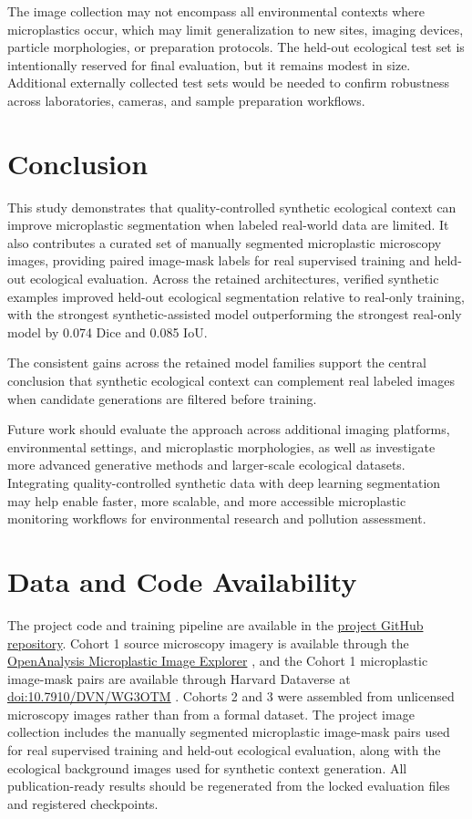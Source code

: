 \documentclass[11pt]{article}
\begin{document}
The image collection may not encompass all environmental contexts where microplastics occur, which may limit generalization to new sites, imaging devices, particle morphologies, or preparation protocols. The held-out ecological test set is intentionally reserved for final evaluation, but it remains modest in size. Additional externally collected test sets would be needed to confirm robustness across laboratories, cameras, and sample preparation workflows.

\section{Conclusion}
This study demonstrates that quality-controlled synthetic ecological context can improve microplastic segmentation when labeled real-world data are limited. It also contributes a curated set of manually segmented microplastic microscopy images, providing paired image-mask labels for real supervised training and held-out ecological evaluation. Across the retained architectures, verified synthetic examples improved held-out ecological segmentation relative to real-only training, with the strongest synthetic-assisted model outperforming the strongest real-only model by 0.074 Dice and 0.085 IoU.

The consistent gains across the retained model families support the central conclusion that synthetic ecological context can complement real labeled images when candidate generations are filtered before training.

Future work should evaluate the approach across additional imaging platforms, environmental settings, and microplastic morphologies, as well as investigate more advanced generative methods and larger-scale ecological datasets. Integrating quality-controlled synthetic data with deep learning segmentation may help enable faster, more scalable, and more accessible microplastic monitoring workflows for environmental research and pollution assessment.
\section*{Data and Code Availability}
The project code and training pipeline are available in the \href{https://github.com/axel-slid/synthetic-microplastic-detection}{project GitHub repository}. Cohort 1 source microscopy imagery is available through the \href{https://www.openanalysis.org/microplastic_image_explorer/}{OpenAnalysis Microplastic Image Explorer} \cite{29}, and the Cohort 1 microplastic image-mask pairs are available through Harvard Dataverse at \href{https://doi.org/10.7910/DVN/WG3OTM}{doi:10.7910/DVN/WG3OTM} \cite{31}. Cohorts 2 and 3 were assembled from unlicensed microscopy images rather than from a formal dataset. The project image collection includes the manually segmented microplastic image-mask pairs used for real supervised training and held-out ecological evaluation, along with the ecological background images used for synthetic context generation. All publication-ready results should be regenerated from the locked evaluation files and registered checkpoints.
\end{document}
